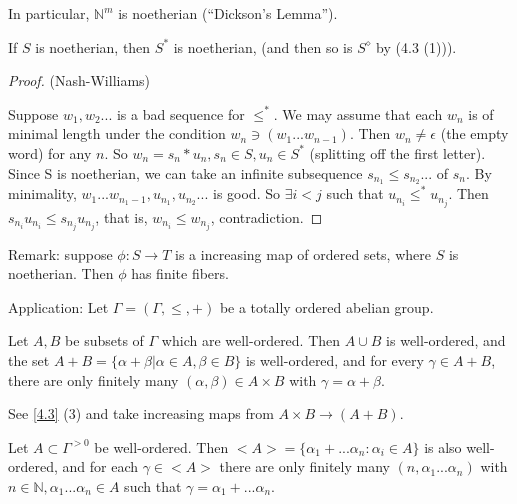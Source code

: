 In particular, $\mathbb{N}^m$ is noetherian (``Dickson's Lemma'').
\begin{theorem} %
If $S$ is noetherian, then $S^*$ is noetherian, (and then so is $S^\diamond$ by (4.3 (1))).
 \end{theorem}

\begin{proof}  %
 
 (Nash-Williams)

Suppose $w_1, w_2...$ is a bad sequence for $\leq^*$. We may assume that each $w_n$ is of minimal length under the condition $w_n \ni (w_1...w_{n-1})$. Then $w_n \neq \epsilon$ (the empty word) for any $n$. So $w_n=s_{n}*u_{n}, s_n \in S, u_n  \in S^*$ (splitting off the first letter). Since S is noetherian, we can take an infinite subsequence $s_{n_1} \leq s_{n_2}...$ of $s_n$. By minimality, $w_1...w_{n_{1}-1}, u_{n_1}, u_{n_2}...$ is good. So $\exists i<j$ such that $u_{n_i} \leq^* u_{n_j}$. Then $s_{n_i}u_{n_i} \leq s_{n_j}u_{n_j}$, that is, $w_{n_i} \leq w_{n_j}$, contradiction.
\end{proof}

Remark: suppose $\phi: S \rightarrow T$ is a  increasing map of ordered sets, where $S$ is noetherian. Then $\phi$ has finite fibers.

Application: Let $\Gamma=(\Gamma, \leq, +)$ be a totally ordered abelian group.

\begin{corollary} %
Let $A, B$ be subsets of $\Gamma$ which are well-ordered. Then $A \cup B$ is well-ordered, and the set $A+B=\{\alpha + \beta | \alpha \in A, \beta \in B\}$ is well-ordered, and for every $\gamma \in A+B$, there are only finitely many $(\alpha, \beta) \in A \times B$ with $\gamma = \alpha + \beta$.
 \end{corollary}

See \eqref{4.3} (3) and take increasing maps from $A \times B \rightarrow (A+B)$.

\begin{corollary} \label{4.6}%
Let $A \subset \Gamma^{>0}$ be well-ordered. Then $<A>=\{\alpha_1+...\alpha_n: \alpha_i \in A\}$ is also well-ordered, and for each $\gamma \in <A>$ there are only finitely many $(n, \alpha_1...\alpha_n)$ with $n \in \mathbb{N}, \alpha_1...\alpha_n \in A$ such that $\gamma=\alpha_1+...\alpha_n$.
 \end{corollary}

